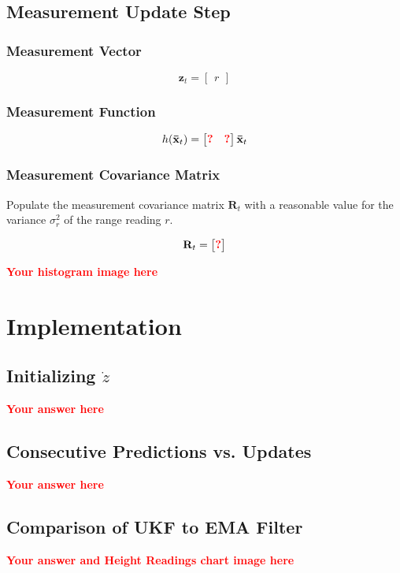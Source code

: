 \documentclass{article}
\newcommand{\todo}[1]{\textcolor{red}{\textbf{#1}}}
\begin{document}
\subsection{Measurement Update Step}

\subsubsection{Measurement Vector}

\begin{equation}
  \mathbf{z}_t = \begin{bmatrix}
  r
  \end{bmatrix}
\end{equation}

\subsubsection{Measurement Function}

\begin{equation}
  h(\mathbf{\bar x}_t) = \begin{bmatrix}
  \todo{?} & \todo{?}
  \end{bmatrix}\mathbf{\bar x}_t
\end{equation}

\subsubsection{Measurement Covariance Matrix}

Populate the measurement covariance matrix $\mathbf{R}_t$ with a reasonable value for the variance $\sigma^2_r$ of the range reading $r$.

\begin{equation}
  \mathbf{R}_t = \begin{bmatrix}
  \todo{?}
  \end{bmatrix}
\end{equation}

\noindent \todo{Your histogram image here}

\section{Implementation}

\subsection{Initializing $\dot z$}
\todo{Your answer here}

\subsection{Consecutive Predictions vs. Updates}
\todo{Your answer here}

\subsection{Comparison of UKF to EMA Filter}
\todo{Your answer and Height Readings chart image here}
\end{document}
